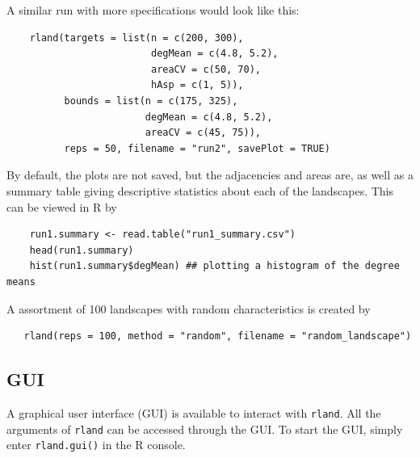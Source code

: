 \documentclass{article}\usepackage{graphicx, color}
\newcommand{\code}[1]{{\tt #1}}
\begin{document}
A similar run with more specifications would look like this:
\begin{verbatim}
    rland(targets = list(n = c(200, 300),
                         degMean = c(4.8, 5.2),
                         areaCV = c(50, 70),
                         hAsp = c(1, 5)),
          bounds = list(n = c(175, 325),
                        degMean = c(4.8, 5.2),
                        areaCV = c(45, 75)),
          reps = 50, filename = "run2", savePlot = TRUE)
\end{verbatim}

By default, the plots are not saved, but the adjacencies and areas are, as well as a summary
table giving descriptive statistics about each of the landscapes. This can be viewed in R
by

\begin{verbatim}
    run1.summary <- read.table("run1_summary.csv")
    head(run1.summary)
    hist(run1.summary$degMean) ## plotting a histogram of the degree means
\end{verbatim}

A assortment of 100 landscapes with random characteristics is created by
\begin{verbatim}
   rland(reps = 100, method = "random", filename = "random_landscape")
\end{verbatim}

\subsection{GUI}

A graphical user interface (GUI) is available to interact with \code{rland}.
All the arguments of \code{rland} can be accessed through the GUI.
To start the GUI, simply enter \code{rland.gui()} in the R console.
\end{document}
